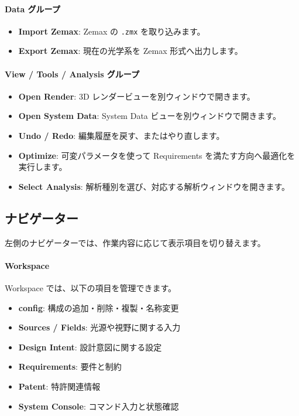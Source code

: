 \documentclass[11pt]{article}
\begin{document}
\paragraph{Data グループ}
\begin{itemize}
  \item \textbf{Import Zemax}: Zemax の \texttt{.zmx} を取り込みます。
  \item \textbf{Export Zemax}: 現在の光学系を Zemax 形式へ出力します。
\end{itemize}

\paragraph{View / Tools / Analysis グループ}
\begin{itemize}
  \item \textbf{Open Render}: 3D レンダービューを別ウィンドウで開きます。
  \item \textbf{Open System Data}: System Data ビューを別ウィンドウで開きます。
  \item \textbf{Undo / Redo}: 編集履歴を戻す、またはやり直します。
  \item \textbf{Optimize}: 可変パラメータを使って Requirements を満たす方向へ最適化を実行します。
  \item \textbf{Select Analysis}: 解析種別を選び、対応する解析ウィンドウを開きます。
\end{itemize}

\subsection{ナビゲーター}
左側のナビゲーターでは、作業内容に応じて表示項目を切り替えます。

\paragraph{Workspace}
Workspace では、以下の項目を管理できます。
\begin{itemize}
  \item \textbf{config}: 構成の追加・削除・複製・名称変更
  \item \textbf{Sources / Fields}: 光源や視野に関する入力
  \item \textbf{Design Intent}: 設計意図に関する設定
  \item \textbf{Requirements}: 要件と制約
  \item \textbf{Patent}: 特許関連情報
  \item \textbf{System Console}: コマンド入力と状態確認
\end{itemize}
\end{document}
